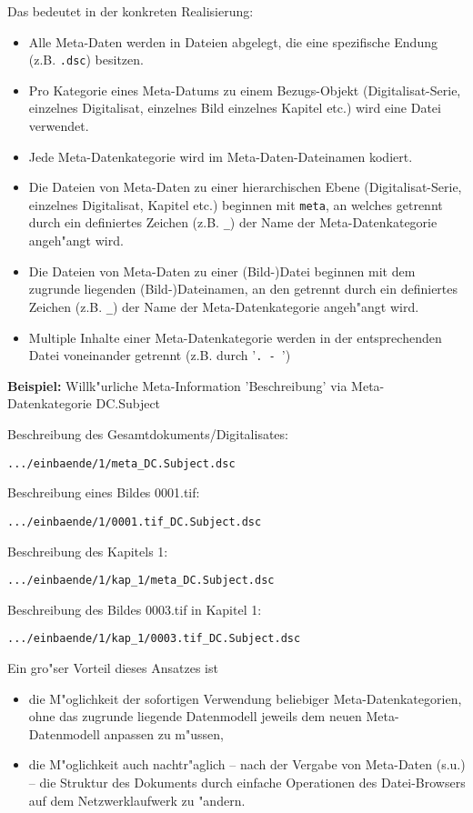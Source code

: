 \documentclass[11pt, twoside, a4paper, BCOR8mm, DIV12, bibtotoc,idxtotoc]{scrreprt}
\begin{document}
Das bedeutet in der konkreten Realisierung:
\begin{itemize}
\item Alle Meta-Daten werden in Dateien abgelegt, die eine spezifische
  Endung (z.B. \texttt{.dsc}) besitzen.
\item Pro Kategorie eines Meta-Datums zu einem Bezugs-Objekt
  (Digitalisat-Serie, einzelnes Digitalisat, einzelnes Bild einzelnes
  Kapitel etc.) wird eine Datei verwendet.
\item Jede Meta-Datenkategorie wird im Meta-Daten-Dateinamen
  kodiert. 
\item Die Dateien von Meta-Daten zu einer hierarchischen Ebene
  (Digitalisat-Serie, einzelnes Digitalisat, Kapitel etc.) beginnen
  mit \texttt{meta},  an welches getrennt durch ein
  definiertes Zeichen (z.B.  \texttt{\_}) der Name der
  Meta-Datenkategorie angeh"angt wird.
\item Die Dateien von Meta-Daten zu einer (Bild-)Datei beginnen mit
  dem zugrunde liegenden (Bild-)Dateinamen, an den getrennt durch ein
  definiertes Zeichen (z.B.  \texttt{\_}) der Name der
  Meta-Datenkategorie angeh"angt wird.
\item Multiple Inhalte einer Meta-Datenkategorie werden in der
  entsprechenden Datei voneinander getrennt (z.B. durch '\texttt{. - }')
\end{itemize}

\textbf{Beispiel:} Willk"urliche Meta-Information 'Beschreibung' via
Meta-Datenkategorie DC.Subject

Beschreibung des Gesamtdokuments/Digitalisates:
\begin{verbatim}
.../einbaende/1/meta_DC.Subject.dsc 
\end{verbatim}

Beschreibung eines Bildes 0001.tif:
\begin{verbatim}
.../einbaende/1/0001.tif_DC.Subject.dsc
\end{verbatim}

Beschreibung des Kapitels 1:
\begin{verbatim}
.../einbaende/1/kap_1/meta_DC.Subject.dsc
\end{verbatim}

Beschreibung des Bildes 0003.tif in Kapitel 1:
\begin{verbatim}
.../einbaende/1/kap_1/0003.tif_DC.Subject.dsc
\end{verbatim}

Ein gro"ser Vorteil dieses Ansatzes ist
\begin{itemize}
\item die M"oglichkeit der sofortigen Verwendung beliebiger
  Meta-Datenkategorien, ohne das zugrunde liegende Datenmodell jeweils
  dem neuen Meta-Datenmodell anpassen zu m"ussen,
\item die M"oglichkeit auch nachtr"aglich -- nach der Vergabe von
  Meta-Daten (s.u.) -- die Struktur des Dokuments durch einfache Operationen
  des Datei-Browsers auf dem Netzwerklaufwerk zu "andern.
\end{itemize}
\end{document}
